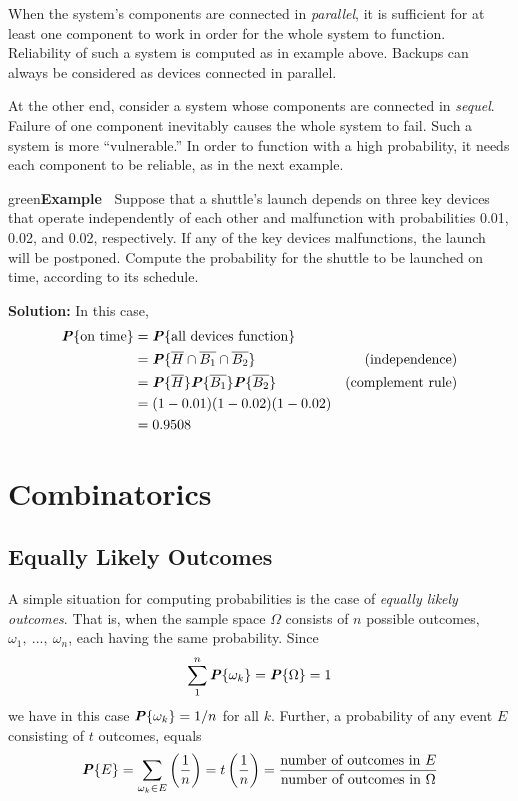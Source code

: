 \documentclass{article}
\newcounter{example}
\newenvironment{example}[1]{\begin{mybox}{green}{\refstepcounter{example}\textbf{Example~\theexample #1}}}{\end{mybox}}
\begin{document}
When the system’s components are connected in \textit{parallel}, it is sufficient for at least one component to work in order for the whole system to function. Reliability of such a system is computed as in example above. Backups can always be considered as devices connected in parallel.

At the other end, consider a system whose components are connected in \textit{sequel}. Failure of one component inevitably causes the whole system to fail. Such a system is more “vulnerable.” In order to function with a high probability, it needs each component to be reliable, as in the next example.

\begin{example}{}
Suppose that a shuttle’s launch depends on three key devices that operate independently of each other and malfunction with probabilities 0.01, 0.02, and 0.02, respectively. If any of the key devices malfunctions, the launch will be postponed. Compute the probability for the shuttle to be launched on time, according to its schedule.

\textbf{Solution:}
In this case,
\begin{align*}
    \textbf{\textit{P}}\{\text{on time}\} &= \textbf{\textit{P}}\{\text{all devices function}\}\\
    &= \textbf{\textit{P}}\{\overline{H} \cap \overline{B_1} \cap \overline{B_2}\} &\text{(independence)}\\
    &= \textbf{\textit{P}}\{\overline{H}\} \textbf{\textit{P}}\{\overline{B_1}\} \textbf{\textit{P}}\{\overline{B_2}\} &\text{(complement rule)}\\
    &= (1 - 0.01)(1 - 0.02)(1 - 0.02)\\
    &= 0.9508
\end{align*}
\end{example}


\section{Combinatorics}

\subsection{Equally Likely Outcomes}

A simple situation for computing probabilities is the case of \textit{equally likely outcomes}. That is, when the sample space $\Omega$ consists of $n$ possible outcomes, $\omega_1,\ ...,\ \omega_n$, each having the same probability. Since
\begin{equation*}
    \sum_{1}^{n} \textbf{\textit{P}}\{\omega_k\} = \textbf{\textit{P}}\{\Omega\} = 1
\end{equation*}
we have in this case $\textbf{\textit{P}}\{\omega_k\} = 1/n$ for all $k$. Further, a probability of any event $E$ consisting of $t$ outcomes, equals
\begin{equation*}
    \textbf{\textit{P}}\{E\} = \sum_{\omega_k \in E} \left( \frac{1}{n} \right) = t \left( \frac{1}{n} \right) = \frac{\text{number of outcomes in $E$}}{\text{number of outcomes in $\Omega$}}
\end{equation*}
\end{document}

